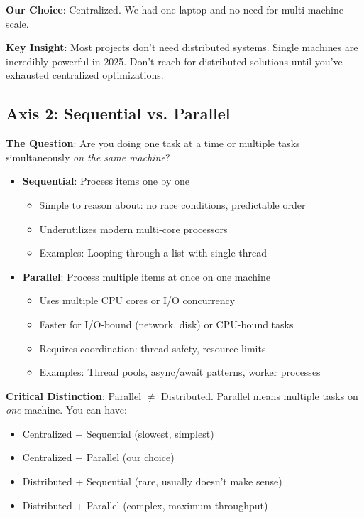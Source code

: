 \documentclass[11pt,a4paper]{article}
\begin{document}
\textbf{Our Choice}: Centralized. We had one laptop and no need for multi-machine scale.

\textbf{Key Insight}: Most projects don't need distributed systems. Single machines are incredibly powerful in 2025. Don't reach for distributed solutions until you've exhausted centralized optimizations.

\subsection{Axis 2: Sequential vs. Parallel}

\textbf{The Question}: Are you doing one task at a time or multiple tasks simultaneously \textit{on the same machine}?

\begin{itemize}
    \item \textbf{Sequential}: Process items one by one
    \begin{itemize}
        \item Simple to reason about: no race conditions, predictable order
        \item Underutilizes modern multi-core processors
        \item Examples: Looping through a list with single thread
    \end{itemize}

    \item \textbf{Parallel}: Process multiple items at once on one machine
    \begin{itemize}
        \item Uses multiple CPU cores or I/O concurrency
        \item Faster for I/O-bound (network, disk) or CPU-bound tasks
        \item Requires coordination: thread safety, resource limits
        \item Examples: Thread pools, async/await patterns, worker processes
    \end{itemize}
\end{itemize}

\textbf{Critical Distinction}: Parallel $\neq$ Distributed. Parallel means multiple tasks on \textit{one} machine. You can have:
\begin{itemize}
    \item Centralized + Sequential (slowest, simplest)
    \item Centralized + Parallel (our choice)
    \item Distributed + Sequential (rare, usually doesn't make sense)
    \item Distributed + Parallel (complex, maximum throughput)
\end{itemize}
\end{document}
